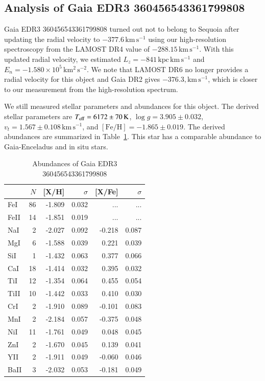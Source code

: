 \documentclass{aa}
\begin{document}
\begin{appendix}
\section{Analysis of Gaia EDR3 360456543361799808\label{appendixA}}
Gaia EDR3 360456543361799808 turned out not to belong to Sequoia after updating the radial velocity to $-377.6\,\mathrm{km\,s^{-1}}$ using our high-resolution spectroscopy from the LAMOST DR4 value of $-288.15\,\mathrm{km\,s^{-1}}$.
With this updated radial velocity, we estimated $L_z=-841\,\mathrm{kpc\,km\,s^{-1}}$ and $E_n=-1.580\times 10^5\,\mathrm{km^2\,s^{-2}}$.
We note that LAMOST DR6 no longer provides a radial velocity for this object and Gaia DR2 gives $-376.3,\mathrm{km\,s^{-1}}$, which is closer to our measurement from the high-resolution spectrum.

We still measured stellar parameters and abundances for this object.
The derived stellar parameters are $T_{\rm eff}=6172\pm 70\,\mathrm{K}$, $\log g=3.905\pm0.032$, $v_t=1.567\pm0.108\,\mathrm{km\,s^{-1}}$, and $[\mathrm{Fe/H}]=-1.865\pm0.019$.
The derived abundances are summarized in Table~\ref{tab:0360}.
This star has a comparable abundance to Gaia-Enceladus and in situ stars.

\begin{table}
\caption{Abundances of Gaia EDR3 360456543361799808 \label{tab:0360}}
\begin{tabular}{l*{5}{r}}\hline\hline
     & $N$ & [{X}/{H}] & $\sigma$ & [{X}/{Fe}] & $\sigma$\\\hline
FeI  &     86&    -1.809&     0.032&       ...&       ...\\
FeII &     14&    -1.851&     0.019&       ...&       ...\\
NaI  &      2&    -2.027&     0.092&    -0.218&     0.087\\
MgI  &      6&    -1.588&     0.039&     0.221&     0.039\\
SiI  &      1&    -1.432&     0.063&     0.377&     0.066\\
CaI  &     18&    -1.414&     0.032&     0.395&     0.032\\
TiI  &     12&    -1.354&     0.064&     0.455&     0.054\\
TiII &     10&    -1.442&     0.033&     0.410&     0.030\\
CrI  &      2&    -1.910&     0.089&    -0.101&     0.083\\
MnI  &      2&    -2.184&     0.057&    -0.375&     0.048\\
NiI  &     11&    -1.761&     0.049&     0.048&     0.045\\
ZnI  &      2&    -1.670&     0.045&     0.139&     0.041\\
YII  &      2&    -1.911&     0.049&    -0.060&     0.046\\
BaII &      3&    -2.032&     0.053&    -0.181&     0.049\\\hline
\end{tabular}
\end{table}


\end{appendix}
\end{document}

